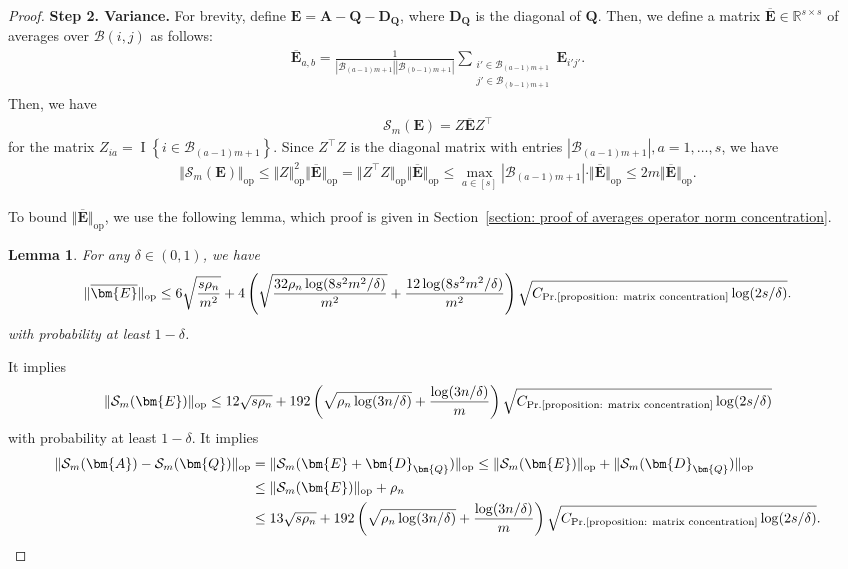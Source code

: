 \documentclass[11pt]{article}
\newcommand{\bbR}{\mathbb{R}}
\newcommand{\op}{\mathrm{op}}
\newcommand{\bA}{\bm{A}}
\newcommand{\bQ}{\bm{Q}}
\newcommand{\bE}{\bm{E}}
\newcommand{\cB}{\mathcal{B}}
\newcommand{\bD}{\bm{D}}
\newcommand{\indicator}[1]{{\operatorname{I} \left \{ #1\right \}}}
\newcommand{\constantBandeira}{C_{\text{Pr.\ref{proposition: matrix concentration}}}}
\newcommand{\<}{\langle}
\renewcommand{\>}{\rangle}
\newcommand{\cS}{\mathcal{S}}
\newcommand{\avgMatrix}{\overline{\bm{E}}}
\theoremstyle{plain}
\newtheorem{lemma}{Lemma}
\theoremstyle{definition}
\theoremstyle{remark}
\begin{document}
{\begin{proof}
\noindent \textbf{Step 2. Variance.} For brevity, define $\bE = \bA - \bQ - \bD_{\bQ}$, where $\bD_{\bQ}$ is the diagonal of $\bQ$. Then, we define a matrix $\overline{\bE} \in \bbR^{s \times s}$ of averages over $\cB(i, j)$ as follows:
\begin{align*}
    \avgMatrix_{a,b} = \frac{1}{|\cB_{(a - 1)m + 1}||\cB_{(b - 1)m + 1}|} \sum_{\substack{i' \in \cB_{(a -1)m + 1} \\ j' \in \cB_{(b - 1)m + 1}}} \bE_{i' j'}.
\end{align*}
Then, we have
\begin{align*}
    \cS_m(\bE) = Z \avgMatrix Z^\top
\end{align*}
for the matrix $Z_{ia} = \indicator{i \in \cB_{(a - 1)m + 1}}$. Since $Z^\top Z$ is the diagonal matrix with entries $|\cB_{(a - 1)m + 1}|, a = 1, \ldots, s$, we have
\begin{align*}
    \Vert \cS_m(\bE) \Vert_{\op} \le \Vert Z \Vert_{\op}^2 \Vert \avgMatrix \Vert_{\op} = \Vert Z^\top Z \Vert_{\op} \Vert \avgMatrix \Vert_{\op} \le \max_{a \in [s]} |\cB_{(a - 1)m + 1}| \cdot \Vert \avgMatrix \Vert_{\op} \le 2m \Vert \avgMatrix \Vert_{\op}.
\end{align*}

To bound $\Vert \avgMatrix \Vert_{\op}$, we use the following lemma, which proof is given in Section~\ref{section: proof of averages operator norm concentration}.
\begin{lemma}
\label{lemma: central averages lemma}
    For any $\delta \in (0, 1)$, we have
    \begin{align*}
        \Vert \avgMatrix\Vert_{\op} \le    6 \sqrt{\frac{s \rho_n}{m^2}} + 4 \left ( \sqrt{\frac{32 \rho_n \log(8 s^2 m^2/\delta)}{m^2}} + \frac{12 \log(8 s^2 m^2/\delta)}{m^2}\right ) \sqrt{\constantBandeira \log(2s/\delta)}.
    \end{align*}
with probability at least $1 - \delta$.
\end{lemma}
It implies
\begin{align}
     \Vert \cS_m(\bE) \Vert_{\op} \le 12 \sqrt{s \rho_n} + 192 \left ( \sqrt{\rho_n \log(3 n/\delta)} + \frac{\log(3 n/\delta)}{m}\right ) \sqrt{\constantBandeira \log(2s/\delta)}\label{eq: bound on E0}
\end{align}
with probability at least $1 - \delta$. It implies
\begin{align*}
    \Vert \cS_m(\bA) - \cS_m(\bQ) \Vert_{\op} & = \Vert \cS_m(\bE + \bD_{\bQ}) \Vert_{\op} \le \Vert \cS_m(\bE) \Vert_{\op} + \Vert \cS_m(\bD_{\bQ})\Vert_{\op}  \\
    & \le \Vert \cS_m(\bE) \Vert_{\op} + \rho_n \\
    & \le 13 \sqrt{s \rho_n} + 192 \left ( \sqrt{\rho_n \log(3 n/\delta)} + \frac{\log(3 n/\delta)}{m}\right ) \sqrt{\constantBandeira \log(2s/\delta)}.
\end{align*}



\end{proof}}
\end{document}
